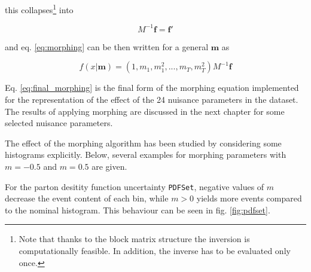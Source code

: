 this collapses\footnote{Note that thanks to the block matrix structure the inversion is computationally feasible. In addition, the inverse has to be evaluated only once.} into

\begin{equation*}
	M^{-1}\mathbf{f} = \mathbf{f}'
\end{equation*}

and eq. \ref{eq:morphing} can be then written for a general $\mathbf{m}$ as

\begin{equation}
	f(x|\mathbf{m}) = (1, m_1, m_1^2, ..., m_T, m^2_T) M^{-1}\mathbf{f}
	\label{eq:final_morphing}
\end{equation}

Eq. \ref{eq:final_morphing} is the final form of the morphing equation implemented for the representation of the effect of the 24 nuisance parameters in the dataset. The results of applying morphing are discussed in the next chapter for some selected nuisance parameters.


The effect of the morphing algorithm has been studied by considering some histograms explicitly. Below, several examples for morphing parameters with $m=-0.5$ and $m = 0.5$ are given.

For the parton desitity function uncertainty \texttt{PDFSet}, negative values of $m$ decrease the event content of each bin, while $m>0$ yields more events compared to the nominal histogram. This behaviour can be seen in fig. \ref{fig:pdfset}.

